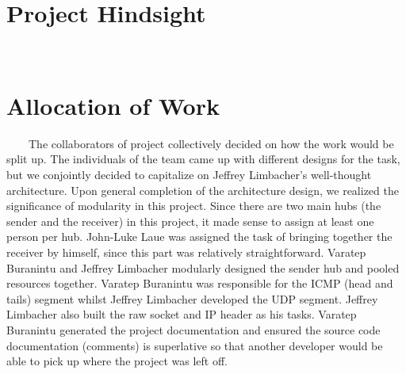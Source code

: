 \documentclass[11pt]{article}
\begin{document}
\section{Project Hindsight}
\ \ \ \ 

\section{Allocation of Work}
\ \ \ \ The collaborators of project collectively decided on how the work would be split up. The individuals of the team came up with different designs for the task, but we conjointly decided to capitalize on Jeffrey Limbacher's well-thought architecture. Upon general completion of the architecture design, we realized the significance of modularity in this project. Since there are two main hubs (the sender and the receiver) in this project, it made sense to assign at least one person per hub. John-Luke Laue was assigned the task of bringing together the receiver by himself, since this part was relatively straightforward. Varatep Buranintu and Jeffrey Limbacher modularly designed the sender hub and pooled resources together. Varatep Buranintu was responsible for the ICMP (head and tails) segment whilst Jeffrey Limbacher developed the UDP segment. Jeffrey Limbacher also built the raw socket and IP header as his tasks. Varatep Buranintu generated the project documentation and ensured the source code documentation (comments) is superlative so that another developer would be able to pick up where the project was left off.
\end{document}
